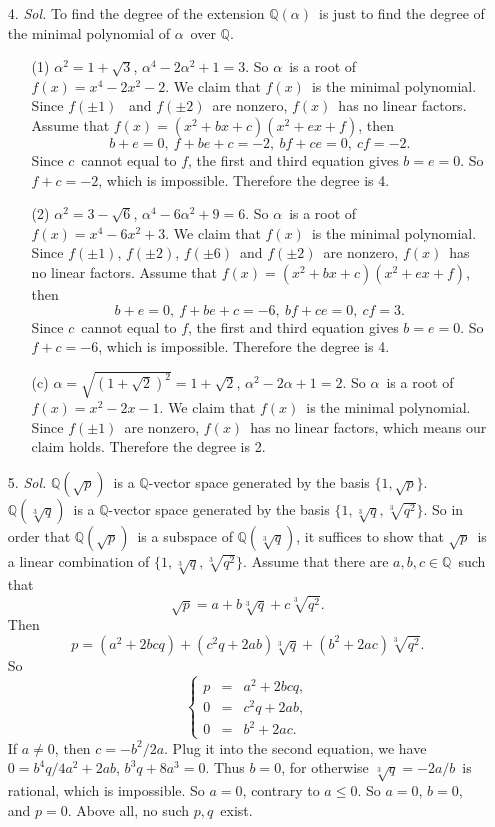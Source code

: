 \documentclass[12pt]{article}
\newcommand{\Q}{\mathbb{Q}}
\begin{document}
\begin{enumerate}
	\item[4.]
	\textit{Sol.} To find the degree of the extension $\Q(\alpha)$\ is just to find the degree of the minimal polynomial of $\alpha$\ over $\Q$.
	\begin{enumerate}
		\item[(1)]
			$\alpha^2=1+\sqrt{3}$, $\alpha^4-2\alpha^2+1=3$. So $\alpha$\ is a root of $f(x)=x^4-2x^2-2$. We claim that $f(x)$\ is the minimal polynomial. Since $f(\pm1)$
\ and $f(\pm2)$\ are nonzero, $f(x)$\ has no linear factors. Assume that $f(x)=(x^2+bx+c)(x^2+ex+f)$, then
			$$b+e=0,\ f+be+c=-2,\ bf+ce=0,\ cf=-2.$$
			Since $c$\ cannot equal to $f$, the first and third equation gives $b=e=0$. So $f+c=-2$, which is impossible. Therefore the degree is 4.
		\item[(2)]
			$\alpha^2=3-\sqrt{6}$, $\alpha^4-6\alpha^2+9=6$. So $\alpha$\ is a root of $f(x)=x^4-6x^2+3$. We claim that $f(x)$\ is the minimal polynomial. Since $f(\pm1)$, $f(\pm2)$, $f(\pm6)$\ and $f(\pm2)$\ are nonzero, $f(x)$\ has no linear factors. Assume that $f(x)=(x^2+bx+c)(x^2+ex+f)$, then
			$$b+e=0,\ f+be+c=-6,\ bf+ce=0,\ cf=3.$$
			Since $c$\ cannot equal to $f$, the first and third equation gives $b=e=0$. So $f+c=-6$, which is impossible. Therefore the degree is 4.
		\item[(c)]
			$\alpha=\sqrt{(1+\sqrt{2})^2}=1+\sqrt{2}$, $\alpha^2-2\alpha+1=2$. So $\alpha$\ is a root of $f(x)=x^2-2x-1$. We claim that $f(x)$\ is the minimal polynomial. Since $f(\pm1)$\ are nonzero, $f(x)$\ has no linear factors, which means our claim holds. Therefore the degree is 2.
	\end{enumerate}
	\item[5.]
	\textit{Sol.}
		$\Q(\sqrt{p})$\ is a $\Q$-vector space generated by the basis $\{1,\sqrt{p}\}$. $\Q(\sqrt[3]{q})$\ is a $\Q$-vector space generated by the basis $\{1,\sqrt[3]{q},\sqrt[3]{q^2}\}$. So in order that $\Q(\sqrt{p})$\ is a subspace of $\Q(\sqrt[3]{q})$, it suffices to show that $\sqrt{p}$\ is a linear combination of $\{1,\sqrt[3]{q},\sqrt[3]{q^2}\}$. Assume that there are $a,b,c\in\Q$\ such that
		$$\sqrt{p}=a+b\sqrt[3]{q}+c\sqrt[3]{q^2}.$$
		Then
		$$p=(a^2+2bcq)+(c^2q+2ab)\sqrt[3]{q}+(b^2+2ac)\sqrt[3]{q^2}.$$
		So
		$$\left\{
		\begin{array}{rcl}
			p&=&a^2+2bcq,\\
			0&=&c^2q+2ab,\\
			0&=&b^2+2ac.
		\end{array}
		\right.$$
		If $a\neq0$, then $c=-b^2/2a$. Plug it into the second equation, we have $0=b^4q/4a^2+2ab$, $b^3q+8a^3=0$. Thus $b=0$, for otherwise $\sqrt[3]{q}=-2a/b$\ is rational, which is impossible. So $a=0$, contrary to $a\leq0$. So $a=0$, $b=0$, and $p=0$. Above all, no such $p,q$\ exist.

\end{enumerate}
\end{document}
